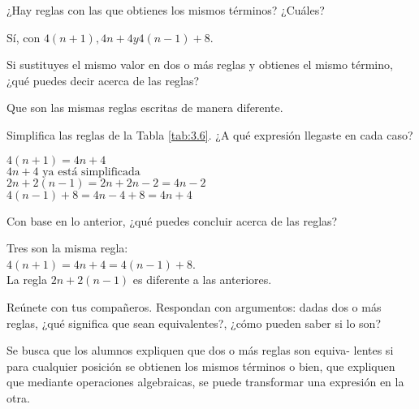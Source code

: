 \begin{multicols}{2}
    \begin{parts}
        ¿Hay reglas con las que obtienes los mismos términos? ¿Cuáles?

        \begin{solutionbox}{4em}
            Sí, con $4(n + 1), 4n +4 y 4(n - 1)+8$.
        \end{solutionbox}

        Si sustituyes el mismo valor en dos o más reglas y obtienes el mismo término, ¿qué puedes decir acerca de las reglas?

        \begin{solutionbox}{6em}
            Que son las mismas reglas escritas de manera diferente.
        \end{solutionbox}

        Simplifica las reglas de la Tabla \ref{tab:3.6}. ¿A qué expresión llegaste en cada caso?

        \begin{solutionbox}{8em}
            $4(n + 1) = 4n + 4$\\
            $4n + 4 \text{ ya está simplificada}$\\
            $2n + 2(n - 1) = 2n + 2n - 2 = 4n - 2$\\
            $4(n - 1) + 8 = 4n - 4 + 8 = 4n + 4$\\
        \end{solutionbox}

        Con base en lo anterior, ¿qué puedes concluir acerca de las reglas?

        \begin{solutionbox}{8em}
            Tres son la misma regla:\\
            $4(n + 1) = 4n + 4 = 4(n - 1) + 8$.\\
            La regla $2n + 2(n - 1)$ es diferente a las anteriores.
        \end{solutionbox}

        Reúnete con tus compañeros. Respondan con argumentos: dadas dos o más reglas, ¿qué
        significa que sean equivalentes?, ¿cómo pueden saber si lo son?

        \begin{solutionbox}{10em}
            Se busca que los alumnos expliquen que dos o más reglas son equiva-
            lentes si para cualquier posición se obtienen los mismos términos o bien, que
            expliquen que mediante operaciones algebraicas, se puede transformar una
            expresión en la otra.
        \end{solutionbox}
    \end{parts}%
\end{multicols}
